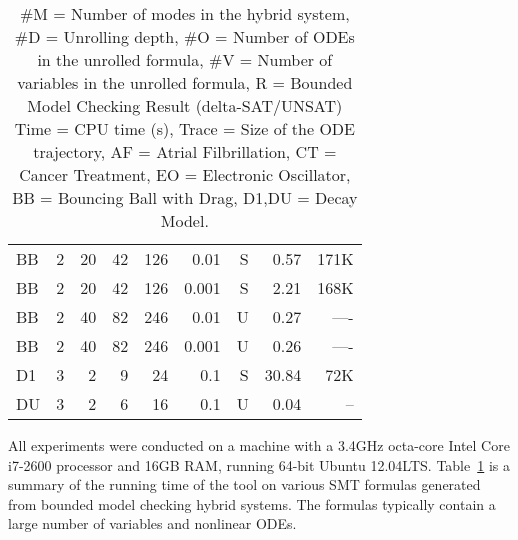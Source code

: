 \documentclass[12pt]{article}
\begin{document}
{\begin{table}[!th]
\begin{tabular}{l|r|r|r|r|r|r|r|r}
    BB & 2     & 20       & 42     & 126     & 0.01        & S & 0.57     & 171K       \\
    BB & 2     & 20       & 42     & 126     & 0.001       & S & 2.21     & 168K       \\
    BB & 2     & 40       & 82     & 246     & 0.01        & U & 0.27     & ----       \\
    BB & 2     & 40       & 82     & 246     & 0.001       & U & 0.26     & ----       \\
    \hline
    \hline
    D1   & 3     & 2        & 9      & 24      & 0.1       & S & 30.84    & 72K      \\
    DU   & 3     & 2        & 6      & 16      & 0.1       & U &  0.04    & --      \\
    \hline
    \hline
  \end{tabular}
  \caption{\small
    \#M = Number of modes in the hybrid system,
    \#D = Unrolling depth,
    \#O = Number of ODEs in the unrolled formula,
    \#V = Number of variables in the unrolled formula,
    R = Bounded Model Checking Result (delta-SAT/UNSAT)
    Time = CPU time (s),
    Trace = Size of the ODE trajectory,
    AF = Atrial Filbrillation,
    CT = Cancer Treatment,
    EO = Electronic Oscillator,
    BB = Bouncing Ball with Drag,
    D1,DU = Decay Model.
}\label{tbl:exp}
\end{table}
}
 
All experiments were conducted on a machine with a 3.4GHz octa-core Intel Core i7-2600 processor and 16GB RAM, running 64-bit Ubuntu 12.04LTS. Table~\ref{tbl:exp} is a summary of the running time of the tool on various SMT formulas generated from bounded model checking hybrid systems. The formulas typically contain a large number of variables and nonlinear ODEs. 
\end{document}
